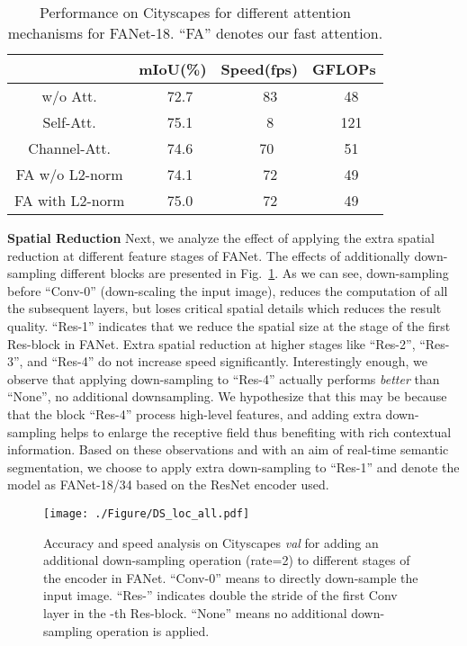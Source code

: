 \begin{table}
\centering
\begin{tabular}{cccc} 
\toprule
             &mIoU(\%)  &Speed(fps) &GFLOPs\\ 
 \midrule 
 w/o Att.    &~~72.7  &~~~83   &~~48\\ 
 Self-Att.\cite{vaswani17att}  &~~75.1  &~~~8    &~~121\\ 
 Channel-Att.\cite{fu2019dual} &~~74.6  &~~70    &~~51\\
 \midrule 
 FA w/o L2-norm &~~74.1  &~~~72   &~~49\\ 
 FA with L2-norm &~~75.0  &~~~72   &~~49\\ 
\bottomrule
\end{tabular}
\vspace{-0.2cm}
\caption{\small{Performance on Cityscapes for different attention mechanisms for FANet-18. ``FA'' denotes our fast attention.}}
\vspace{-0.8cm}
\label{tab:atn}
\end{table}




\noindent\textbf{Spatial Reduction} Next, we analyze the effect of applying the extra spatial reduction at different feature stages of FANet. 
The effects of additionally down-sampling different blocks are presented in Fig.~\ref{fig:DS_loc}. 
As we can see, down-sampling before ``Conv-0'' (down-scaling the input image), reduces the computation of all the subsequent layers, but loses critical spatial details which reduces the result quality. 
``Res-1'' indicates that we reduce the spatial size at the stage of the first Res-block in FANet. 
Extra spatial reduction at higher stages like ``Res-2'', ``Res-3'', and ``Res-4'' do not increase speed significantly.
Interestingly enough, we observe that applying down-sampling to ``Res-4'' actually performs \emph{better} than ``None'', no additional downsampling. 
We hypothesize that this may be because that the block ``Res-4'' process high-level features, and adding extra down-sampling helps to enlarge the receptive field thus benefiting with rich contextual information.
Based on these observations and with an aim of real-time semantic segmentation, we choose to apply extra down-sampling to ``Res-1'' and denote the model as FANet-18/34 based on the ResNet encoder used.


\begin{figure}[h]
\centering
\texttt{[image: ./Figure/DS\_loc\_all.pdf]}
\vspace{-0.6cm}
\caption{\small{Accuracy and speed analysis on Cityscapes \textit{val} for adding an additional down-sampling operation (rate=2) to different stages of the encoder in FANet. ``Conv-0'' means to directly down-sample the input image. ``Res-'' indicates double the stride of the first Conv layer in the -th Res-block. ``None'' means no additional down-sampling operation is applied.}}
\label{fig:DS_loc} 
\vspace{-0.4cm}
\end{figure}
 
